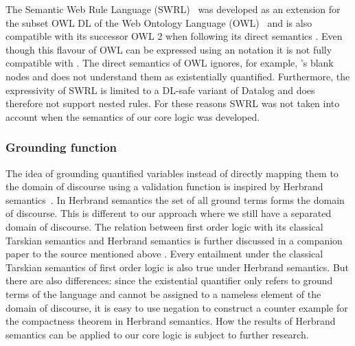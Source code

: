 % 

The Semantic Web Rule Language (SWRL)~\cite{swrl} 
was developed as an extension for the subset OWL DL of the Web Ontology Language (OWL)~\cite{OWLold}
and is also compatible with its successor OWL 2 \cite{owl} when following its direct semantics \cite{OWLds}.
Even though this flavour of OWL can be expressed using an \rdf notation it is not fully compatible with \rdf. The direct semantics of OWL ignores, for example, 
\rdf's blank nodes and does 
not understand them as existentially quantified. Furthermore, the expressivity of SWRL is limited to a DL-safe variant of Datalog and does therefore not support nested rules.
For these reasons SWRL was not taken into account when the semantics of our core logic was developed. 

\subsubsection{Grounding function}
The idea of grounding quantified variables instead of directly mapping them to the domain of discourse using a validation function is inspired by Herbrand semantics~\cite{herbrandLogic}.
In Herbrand semantics the set of all ground terms forms the domain of discourse. This is different to our approach where we still have a separated domain of discourse. The relation
between first order logic with its classical Tarskian semantics and Herbrand semantics is further discussed in a companion paper to the source mentioned above \cite{herbrand}.
Every entailment under the classical Tarskian semantics of first order logic is also true under Herbrand semantics. But there are also differences: since 
the existential quantifier only refers to ground terms of the language and cannot be assigned to a nameless element of the domain of discourse, 
it is easy to use negation to construct a counter example for 
the compactness theorem in
Herbrand semantics. How the results of Herbrand semantics can be applied to our core logic is subject to further research.


